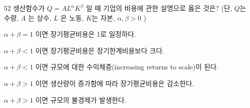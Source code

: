 \begin{question}{52}
생산함수가 $Q=AL^{\alpha}K^{\beta}$ 일 때 기업의 비용에 관한 설명으로 옳은 것은? (단, $Q$는 수량, $A$ 는 상수, $L$ 은 노동, $K$는 자본, $\alpha ,\beta >0$ )
\begin{choices}
  \item $\alpha +\beta =1$ 이면 장기평균비용은 1로 일정하다.
  \item $\alpha +\beta <1$ 이면 장기평균비용은 장기한계비용보다 크다.
  \item $\alpha +\beta <1$ 이면 규모에 대한 수익체증(increasing returns to scale)이 된다.
  \item $\alpha +\beta >1$ 이면 생산량이 증가함에 따라 장기평균비용은 감소한다.
  \item $\alpha +\beta >1$ 이면 규모의 불경제가 발생한다.
\end{choices}
\end{question}
